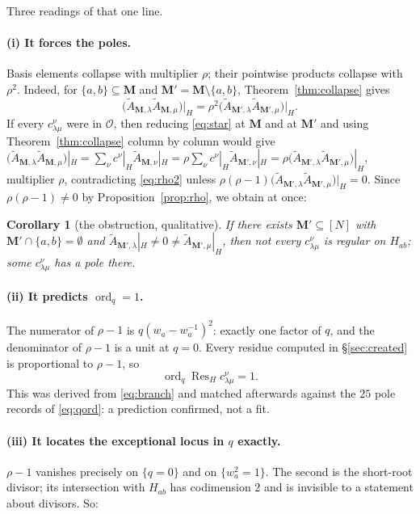 \documentclass[11pt]{article}
\theoremstyle{plain}
\newtheorem{cor}[thm]{Corollary}
\theoremstyle{definition}
\theoremstyle{remark}
\theoremstyle{plain}
\newcommand{\bM}{\mathbf{M}}
\newcommand{\At}{\widetilde{A}}
\newcommand{\ord}{\operatorname{ord}}
\newcommand{\Res}{\operatorname{Res}}
\begin{document}
Three readings of that one line.

\paragraph{(i) It forces the poles.}
Basis elements collapse with multiplier $\rho$; their pointwise products
collapse with $\rho^2$.  Indeed, for $\{a,b\}\subseteq\bM$ and
$\bM'=\bM\setminus\{a,b\}$, Theorem~\ref{thm:collapse} gives
\begin{equation}
\bigl(\At_{\bM,\lambda}\At_{\bM,\mu}\bigr)\big|_H
=\rho^2\bigl(\At_{\bM',\lambda}\At_{\bM',\mu}\bigr)\big|_H .
\label{eq:rho2}
\end{equation}
If every $c^{\nu}_{\lambda\mu}$ were in $\mathcal{O}$, then reducing
\eqref{eq:star} at $\bM$ and at $\bM'$ and using
Theorem~\ref{thm:collapse} column by column would give
$\bigl(\At_{\bM,\lambda}\At_{\bM,\mu}\bigr)|_H
=\sum_{\nu}c^{\nu}|_H\At_{\bM,\nu}|_H
=\rho\sum_{\nu}c^{\nu}|_H\At_{\bM',\nu}|_H
=\rho\bigl(\At_{\bM',\lambda}\At_{\bM',\mu}\bigr)|_H$,
multiplier $\rho$, contradicting \eqref{eq:rho2} unless
$\rho(\rho-1)\bigl(\At_{\bM',\lambda}\At_{\bM',\mu}\bigr)|_H=0$.  Since
$\rho(\rho-1)\neq0$ by Proposition~\ref{prop:rho}, we obtain at once:

\begin{cor}[the obstruction, qualitative]\label{cor:qual}
If there exists $\bM'\subseteq[N]$ with $\bM'\cap\{a,b\}=\emptyset$ and
$\At_{\bM',\lambda}|_H\ne0\ne\At_{\bM',\mu}|_H$, then not every
$c^{\nu}_{\lambda\mu}$ is regular on $H_{ab}$; some $c^{\nu}_{\lambda\mu}$ has
a pole there.
\end{cor}

\paragraph{(ii) It predicts $\ord_q=1$.}
The numerator of $\rho-1$ is $q(w_a-w_a^{-1})^2$: exactly one factor of $q$,
and the denominator of $\rho-1$ is a unit at $q=0$.  Every residue computed in
\S\ref{sec:created} is proportional to $\rho-1$, so
\[
\ord_q\Res_{H}c^{\nu}_{\lambda\mu}=1 .
\]
This was derived from \eqref{eq:branch} and matched afterwards against the
$25$ pole records of \eqref{eq:qord}: a prediction confirmed, not a fit.

\paragraph{(iii) It locates the exceptional locus in $q$ exactly.}
$\rho-1$ vanishes precisely on $\{q=0\}$ and on $\{w_a^2=1\}$.  The second is
the short-root divisor; its intersection with $H_{ab}$ has codimension $2$ and
is invisible to a statement about divisors.  So:
\end{document}
